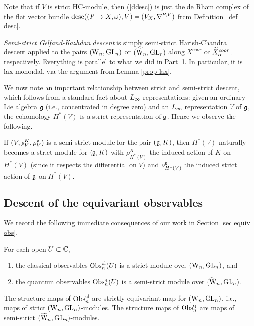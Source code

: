 Note that if $V$ is strict HC-module, then (\ref{ddesc}) is just the de Rham complex of the flat vector bundle 
$\desc((P \to X,\omega), V) = (V_X, \nabla^{P,V})$ from Definition~\ref{def desc}.

\emph{Semi-strict Gelfand-Kazhdan descent} is simply semi-strict Harish-Chandra descent
applied to the pairs $(\Vect,\GL_n)$ or $(\TVect, \GL_n)$  along $X^{coor}$ or $\Tilde{X}^{coor}_\alpha$, respectively. 
Everything is parallel to what we did in Part~1. In particular, it is lax monoidal, via the argument from Lemma \ref{prop lax}.

We now note an important relationship between strict and semi-strict descent,
which follows from a standard fact about $\L8$-representations:
given an ordinary  Lie algebra $\fg$ (i.e., concentrated in degree zero) and an $\L8$ representation $V$ of $\fg$,
the cohomology $H^*(V)$ is a strict representation of $\fg$.
Hence we observe the following.

\begin{lemma}
\label{lem strict vs semistrict}
If $(V, \rho^K_V, \rho^\fg_V)$ is a semi-strict module for the pair $(\fg,K)$,
then $H^*(V)$ naturally becomes a strict module for $(\fg,K)$ with
$\rho^K_{H^*(V)}$ the induced action of $K$ on $H^*(V)$ (since it respects the differential on $V$)
and $\rho^\fg_{H^*(V)}$ the induced strict action of $\fg$ on $H^*(V)$.
\end{lemma}

\subsection{Descent of the equivariant observables}

We record the following immediate consequences of our work in Section
\ref{sec equiv obs}.

\begin{prop}
For each open $U \subset \CC$,
\begin{enumerate}
\item the classical observables $\Obs^\cl_n(U)$ is a strict module over $(\Vect,\GL_n)$, and
\item the quantum observables $\Obs^\q_n(U)$ is a semi-strict module over $(\TVect,\GL_n)$.
\end{enumerate}
The structure maps of $\Obs^\cl_n$ are strictly equivariant map for $(\Vect,\GL_n)$, 
i.e., maps of strict $(\Vect,\GL_n)$-modules.
The structure maps of $\Obs^\q_n$ are maps of semi-strict $(\TVect,\GL_n)$-modules.
\end{prop}

